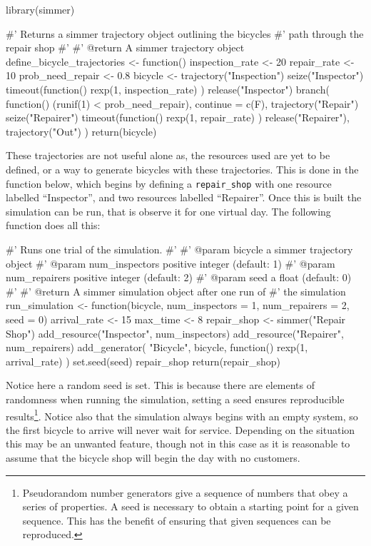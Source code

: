 \begin{Rin}
library(simmer)

#' Returns a simmer trajectory object outlining the bicycles
#' path through the repair shop
#'
#' @return A simmer trajectory object
define_bicycle_trajectories <- function() {
  inspection_rate <- 20
  repair_rate <- 10
  prob_need_repair <- 0.8
  bicycle <-
    trajectory("Inspection") %
    seize("Inspector") %
    timeout(function() {
      rexp(1, inspection_rate)
    }) %
    release("Inspector") %
    branch(
      function() (runif(1) < prob_need_repair),
      continue = c(F),
      trajectory("Repair") %
        seize("Repairer") %
        timeout(function() {
          rexp(1, repair_rate)
        }) %
        release("Repairer"),
      trajectory("Out")
    )
  return(bicycle)
}
\end{Rin}

These trajectories are not useful alone as, the resources used are yet to be defined,
or a way to generate bicycles with these trajectories. This is done in the
function below, which begins by defining a \texttt{repair_shop} with one
resource labelled ``Inspector'', and two resources labelled ``Repairer''.
Once this is built the simulation can be run, that is observe it for one
virtual day. The following function does all this:

\begin{Rin}
#' Runs one trial of the simulation.
#'
#' @param bicycle a simmer trajectory object
#' @param num_inspectors positive integer (default: 1)
#' @param num_repairers positive integer (default: 2)
#' @param seed a float (default: 0)
#'
#' @return A simmer simulation object after one run of
#'         the simulation
run_simulation <- function(bicycle,
                           num_inspectors = 1,
                           num_repairers = 2,
                           seed = 0) {
  arrival_rate <- 15
  max_time <- 8
  repair_shop <-
    simmer("Repair Shop") %
    add_resource("Inspector", num_inspectors) %
    add_resource("Repairer", num_repairers) %
    add_generator(
      "Bicycle", bicycle, function() {
        rexp(1, arrival_rate)
      }
    )
  set.seed(seed)
  repair_shop %
  return(repair_shop)
}
\end{Rin}

Notice here a random seed is set. This is because there are
elements of randomness when running the simulation, setting a seed ensures
reproducible results\footnote{
Pseudorandom number generators give a sequence of numbers that obey a series of
properties. A seed is necessary to obtain a starting point for a given sequence.
This has the benefit of ensuring that given sequences can be reproduced.
}.
Notice also that the simulation always begins with an empty system, so the first
bicycle to arrive will never wait for service. Depending on the situation this
may be an unwanted feature, though not in this case as it is reasonable to
assume that the bicycle shop will begin the day with no customers.

